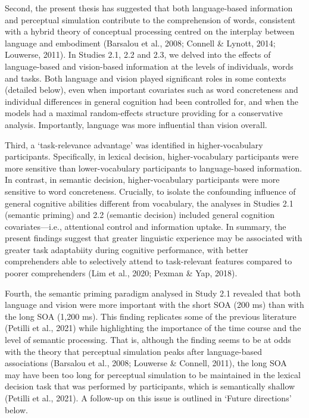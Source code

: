 \documentclass[
  12pt,
  man,floatsintext]{apa7}
\begin{document}
Second, the present thesis has suggested that both language-based information and perceptual simulation contribute to the comprehension of words, consistent with a hybrid theory of conceptual processing centred on the interplay between language and embodiment (Barsalou et al., 2008; Connell \& Lynott, 2014; Louwerse, 2011). In Studies 2.1, 2.2 and 2.3, we delved into the effects of language-based and vision-based information at the levels of individuals, words and tasks. Both language and vision played significant roles in some contexts (detailed below), even when important covariates such as word concreteness and individual differences in general cognition had been controlled for, and when the models had a maximal random-effects structure providing for a conservative analysis. Importantly, language was more influential than vision overall.

Third, a `task-relevance advantage' was identified in higher-vocabulary participants. Specifically, in lexical decision, higher-vocabulary participants were more sensitive than lower-vocabulary participants to language-based information. In contrast, in semantic decision, higher-vocabulary participants were more sensitive to word concreteness. Crucially, to isolate the confounding influence of general cognitive abilities different from vocabulary, the analyses in Studies 2.1 (semantic priming) and 2.2 (semantic decision) included general cognition covariates---i.e., attentional control and information uptake. In summary, the present findings suggest that greater linguistic experience may be associated with greater task adaptabiity during cognitive performance, with better comprehenders able to selectively attend to task-relevant features compared to poorer comprehenders (Lim et al., 2020; Pexman \& Yap, 2018).

Fourth, the semantic priming paradigm analysed in Study 2.1 revealed that both language and vision were more important with the short SOA (200 ms) than with the long SOA (1,200 ms). This finding replicates some of the previous literature (Petilli et al., 2021) while highlighting the importance of the time course and the level of semantic processing. That is, although the finding seems to be at odds with the theory that perceptual simulation peaks after language-based associations (Barsalou et al., 2008; Louwerse \& Connell, 2011), the long SOA may have been too long for perceptual simulation to be maintained in the lexical decision task that was performed by participants, which is semantically shallow (Petilli et al., 2021). A follow-up on this issue is outlined in `Future directions' below.
\end{document}
